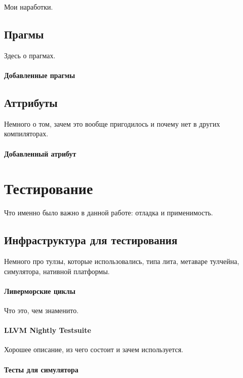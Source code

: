 \documentclass[12pt,a4paper]{article}
\begin{document}
Мои наработки.

\subsection{Прагмы}

Здесь о прагмах.

\paragraph{Добавленные прагмы}

\subsection{Аттрибуты}

Немного о том, зачем это вообще пригодилось и почему нет в других компиляторах.

\paragraph{Добавленный атрибут}

\section{Тестирование}

Что именно было важно в данной работе: отладка и применимость.

\subsection{Инфраструктура для тестирования}

Немного про тулзы, которые использовались, типа лита, метаваре тулчейна, симулятора, нативной платформы.

\paragraph{Ливерморские циклы}

Что это, чем знаменито.

\paragraph{LLVM Nightly Testsuite}

Хорошее описание, из чего состоит и зачем используется.

\paragraph{Тесты для симулятора}
\end{document}

